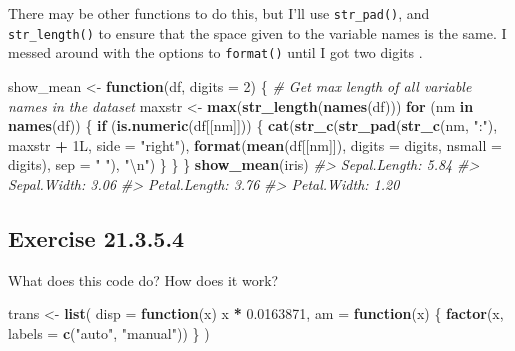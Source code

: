 \documentclass[]{book}
\newenvironment{Shaded}{\begin{snugshade}}{\end{snugshade}}
\newcommand{\CharTok}[1]{\textcolor[rgb]{0.31,0.60,0.02}{#1}}
\newcommand{\CommentTok}[1]{\textcolor[rgb]{0.56,0.35,0.01}{\textit{#1}}}
\newcommand{\ControlFlowTok}[1]{\textcolor[rgb]{0.13,0.29,0.53}{\textbf{#1}}}
\newcommand{\DataTypeTok}[1]{\textcolor[rgb]{0.13,0.29,0.53}{#1}}
\newcommand{\DecValTok}[1]{\textcolor[rgb]{0.00,0.00,0.81}{#1}}
\newcommand{\FloatTok}[1]{\textcolor[rgb]{0.00,0.00,0.81}{#1}}
\newcommand{\KeywordTok}[1]{\textcolor[rgb]{0.13,0.29,0.53}{\textbf{#1}}}
\newcommand{\NormalTok}[1]{#1}
\newcommand{\OperatorTok}[1]{\textcolor[rgb]{0.81,0.36,0.00}{\textbf{#1}}}
\newcommand{\StringTok}[1]{\textcolor[rgb]{0.31,0.60,0.02}{#1}}
\theoremstyle{plain}
\theoremstyle{remark}
\begin{document}
There may be other functions to do this, but I'll use \texttt{str\_pad()}, and \texttt{str\_length()} to ensure that the space given to the variable names is the same.
I messed around with the options to \texttt{format()} until I got two digits .

\begin{Shaded}
\begin{Highlighting}[]
\NormalTok{show_mean <-}\StringTok{ }\ControlFlowTok{function}\NormalTok{(df, }\DataTypeTok{digits =} \DecValTok{2}\NormalTok{) \{}
  \CommentTok{# Get max length of all variable names in the dataset}
\NormalTok{  maxstr <-}\StringTok{ }\KeywordTok{max}\NormalTok{(}\KeywordTok{str_length}\NormalTok{(}\KeywordTok{names}\NormalTok{(df)))}
  \ControlFlowTok{for}\NormalTok{ (nm }\ControlFlowTok{in} \KeywordTok{names}\NormalTok{(df)) \{}
    \ControlFlowTok{if}\NormalTok{ (}\KeywordTok{is.numeric}\NormalTok{(df[[nm]])) \{}
      \KeywordTok{cat}\NormalTok{(}\KeywordTok{str_c}\NormalTok{(}\KeywordTok{str_pad}\NormalTok{(}\KeywordTok{str_c}\NormalTok{(nm, }\StringTok{":"}\NormalTok{), maxstr }\OperatorTok{+}\StringTok{ }\NormalTok{1L, }\DataTypeTok{side =} \StringTok{"right"}\NormalTok{),}
                \KeywordTok{format}\NormalTok{(}\KeywordTok{mean}\NormalTok{(df[[nm]]), }\DataTypeTok{digits =}\NormalTok{ digits, }\DataTypeTok{nsmall =}\NormalTok{ digits),}
                \DataTypeTok{sep =} \StringTok{" "}\NormalTok{),}
          \StringTok{"}\CharTok{\textbackslash{}n}\StringTok{"}\NormalTok{)}
\NormalTok{    \}}
\NormalTok{  \}}
\NormalTok{\}}
\KeywordTok{show_mean}\NormalTok{(iris)}
\CommentTok{#> Sepal.Length: 5.84 }
\CommentTok{#> Sepal.Width:  3.06 }
\CommentTok{#> Petal.Length: 3.76 }
\CommentTok{#> Petal.Width:  1.20}
\end{Highlighting}
\end{Shaded}

\hypertarget{exercise-21.3.5.4}{%
\subsection*{\texorpdfstring{Exercise {21.3.5.4}}{Exercise 21.3.5.4}}\label{exercise-21.3.5.4}}

What does this code do? How does it work?

\begin{Shaded}
\begin{Highlighting}[]
\NormalTok{trans <-}\StringTok{ }\KeywordTok{list}\NormalTok{(}
  \DataTypeTok{disp =} \ControlFlowTok{function}\NormalTok{(x) x }\OperatorTok{*}\StringTok{ }\FloatTok{0.0163871}\NormalTok{,}
  \DataTypeTok{am =} \ControlFlowTok{function}\NormalTok{(x) \{}
    \KeywordTok{factor}\NormalTok{(x, }\DataTypeTok{labels =} \KeywordTok{c}\NormalTok{(}\StringTok{"auto"}\NormalTok{, }\StringTok{"manual"}\NormalTok{))}
\NormalTok{  \}}
\NormalTok{)}
\end{Highlighting}
\end{Shaded}
\end{document}
